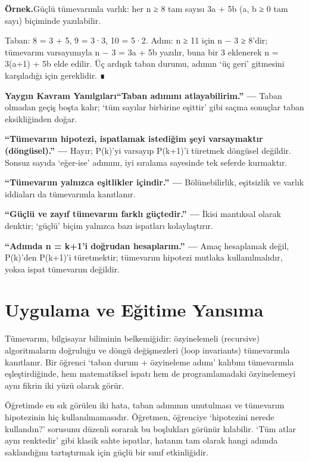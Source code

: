 \begin{tcolorbox}[bookbox,colback=cEx]\textbf{\textsf{\textcolor{cAcc}{Örnek.}}}\quad Güçlü tümevarımla varlık: her n ≥ 8 tam sayısı 3a + 5b (a, b ≥ 0 tam sayı) biçiminde yazılabilir.\par\medskip{}Taban: 8 = 3 + 5, 9 = 3·3, 10 = 5·2. Adım: n ≥ 11 için n − 3 ≥ 8’dir; tümevarım varsayımıyla n − 3 = 3a + 5b yazılır, buna bir 3 eklenerek n = 3(a+1) + 5b elde edilir. Üç ardışık taban durumu, adımın ‘üç geri’ gitmesini karşıladığı için gereklidir. ∎\end{tcolorbox}

\begin{tcolorbox}[bookbox,colback=cMis]\textbf{\textsf{\textcolor{cAcc}{Yaygın Kavram Yanılgıları}}}\quad \textbf{“Taban adımını atlayabilirim.” — }Taban olmadan geçiş boşta kalır; ‘tüm sayılar birbirine eşittir’ gibi saçma sonuçlar taban eksikliğinden doğar.\par\medskip{}\textbf{“Tümevarım hipotezi, ispatlamak istediğim şeyi varsaymaktır (döngüsel).” — }Hayır; P(k)’yi varsayıp P(k+1)’i türetmek döngüsel değildir. Sonsuz sayıda ‘eğer-ise’ adımını, iyi sıralama sayesinde tek seferde kurmaktır.\par\medskip{}\textbf{“Tümevarım yalnızca eşitlikler içindir.” — }Bölünebilirlik, eşitsizlik ve varlık iddiaları da tümevarımla kanıtlanır.\par\medskip{}\textbf{“Güçlü ve zayıf tümevarım farklı güçtedir.” — }İkisi mantıksal olarak denktir; ‘güçlü’ biçim yalnızca bazı ispatları kolaylaştırır.\par\medskip{}\textbf{“Adımda n = k+1’i doğrudan hesaplarım.” — }Amaç hesaplamak değil, P(k)’den P(k+1)’i türetmektir; tümevarım hipotezi mutlaka kullanılmalıdır, yoksa ispat tümevarım değildir.\end{tcolorbox}

\section{Uygulama ve Eğitime Yansıma}

Tümevarım, bilgisayar biliminin belkemiğidir: özyinelemeli (recursive) algoritmaların doğruluğu ve döngü değişmezleri (loop invariants) tümevarımla kanıtlanır. Bir öğrenci ‘taban durum + özyineleme adımı’ kalıbını tümevarımla eşleştirdiğinde, hem matematiksel ispatı hem de programlamadaki özyinelemeyi aynı fikrin iki yüzü olarak görür.

Öğretimde en sık görülen iki hata, taban adımının unutulması ve tümevarım hipotezinin hiç kullanılmamasıdır. Öğretmen, öğrenciye ‘hipotezini nerede kullandın?’ sorusunu düzenli sorarak bu boşlukları görünür kılabilir. ‘Tüm atlar aynı renktedir’ gibi klasik sahte ispatlar, hatanın tam olarak hangi adımda saklandığını tartıştırmak için güçlü bir sınıf etkinliğidir.

